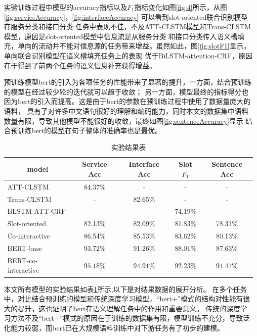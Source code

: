   实验训练过程中模型的accuracy指标以及$F_1$指标变化如图\ref{fig:4}所示，从图\ref{fig:serviceAccuracy}，\ref{fig:interfaceAccuracy}
  可以看到slot-oriented联合识别模型在服务分类和接口分类
  任务中表现不佳，不及ATT-CLSTM模型和Trans-CLSTM模型，原因是slot-oriented模型中信息流是从服务分类
  和接口分类传入语义槽填充，单向的流动并不能对信息源的任务带来增益。虽然如此，图\ref{fig:slotF1}显示，单向联合识别模型在语义槽填充任务上的表现
  优于BiLSTM-attention-CRF，原因在于得到了前两个任务的语义信息补充获得增益。

  预训练模型bert的引入为各项任务的性能带来了显著的提升，一方面，结合预训练的模型在经过较少轮的迭代就可以趋于收敛；
  另一方面，模型最终的指标得分也因为bert的引入而提高。这是由于bert的参数在预训练过程中使用了数据量庞大的语料，
  具有了对许多中文语句很好的理解和编码能力，同时本文的数据集中语料数量有限，导致其他模型不能很好的收敛，最终如图\ref{fig:sentenceAccuracy}显示
  结合预训练bert的模型在句子整体的准确率也是最优。

  \begin{table}[htb]
    \centering
    \caption{实验结果表}
    \label{tab:jieguo}
\begin{tabular}{l|cccc}
  \toprule
  \multicolumn{1}{c|}{\centering model}&Service Acc&Interface Acc&Slot $F_1$&Sentence Acc\\
   \hline
   ATT-CLSTM&84.37\%&-&-&-\\
   Trans-CLSTM&-&82.65\%&-&-\\
   BLSTM-ATT-CRF&-&-&74.19\%&-\\
   Slot-oriented&82.13\%&82.09\%&81.83\%&78.31\%\\
   Co-interactive&86.54\%&85.53\%&83.62\%&80.13\%\\
   BERT-base&93.72\%&91.26\%&88.01\%&87.63\%\\
   BERT-co-interactive&$\mathbf{95.18\%}$&$\mathbf{94.91}\%$&$\mathbf{92.23}\%$&$\mathbf{91.47}\%$\\
  \bottomrule
  \end{tabular}
\end{table}

本文所有模型的实验结果如表\ref{tab:jieguo}所示,以下是对结果数据的展开分析。
在多个任务中，对比结合预训练的模型和传统深度学习模型，“bert+”模式的结构对性能有很大的提升，这也证明了bert在语义理解任务中的作用和重要意义。
传统的深度学习方法不及“bert+”模式的原因在于训练的数据集有限，模型训练不充分，导致泛化能力较弱，而bert已在大规模语料训练中对下游任务有了初步的建模。

